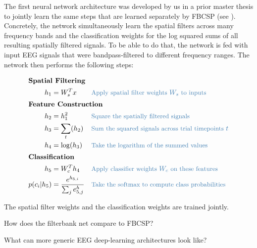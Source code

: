     The first neural network architecture was developed by us in a prior
master thesis \citep{schirrmeister_msc_thesis_2015} to
jointly learn the same steps that are learned separately by FBCSP (see
). Concretely, the network
simultaneously learn the spatial filters across many frequency bands and
the classification weights for the log squared sums of all resulting
spatially filtered signals. To be able to do that, the network is fed
with input EEG signals that were bandpass-filtered to different
frequency ranges. The network then performs the following steps:




\begin{align*}
    \intertext{\textbf{Spatial Filtering}}
    h_1 &= W_s^Tx && \codecomment{\text{Apply spatial filter weights } W_s \text{ to  inputs }} \\
    \intertext{\textbf{Feature Construction}}
    h_2 &= h_1^2 && \codecomment{\text{Square the spatially filtered signals }} \\
    h_3 &=\sum_t (h_2) && \codecomment{\text{Sum the squared signals across trial timepoints } t} \\
    h_4 &= \log(h_3) && \codecomment{\text{Take the logarithm of the summed values}}\\
    \intertext{\textbf{Classification}}
    h_5 &= W_c^Th_4 && \codecomment{\text{Apply classifier weights } W_c \text{ on these features }} \\
    p(c_i|h_5) &= \frac{e^{h_{5,i}}}{\sum_j e^h_{5,j}} && \codecomment{\text{Take the softmax to compute class probabilities}} \\
\end{align*}

    The spatial filter weights and the classification weights are trained
jointly.

\begin{openbox}
\item How does the filterbank net compare to FBCSP?
\item What can more generic EEG deep-learning architectures look like?
\end{openbox}

